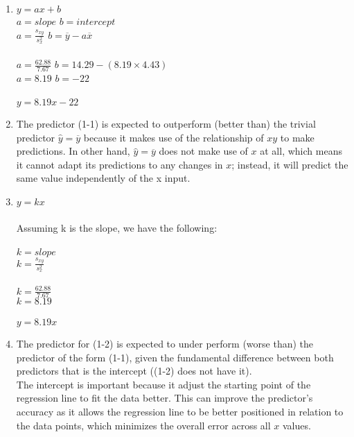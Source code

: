 \documentclass{assignment}
\begin{document}
\begin{problem}
\begin{enumerate}[label=\alph*)]
    
    \item 
    $y = ax + b$\\
    $a = slope$  \quad  $b = intercept$ \\
    $a = \frac{s_{xy}}{s^2_x} $ \quad\quad $ b = \overline{y}-a\overline{x}$ \\\\
    $a = \frac{62.88}{7.67}$ \quad\quad $b = 14.29 - (8.19 \times 4.43)$\\
    $a = 8.19$ \quad\quad $b = -22$\\\\
    $y = 8.19x - 22$

    
    \item 
    The predictor (1-1) is expected to outperform (better than) the trivial predictor $\hat{y} = \overline{y}$ because it makes use of the relationship of $xy$ to  make predictions. In other hand, $\hat{y} = \overline{y}$ does not make use of $x$ at all, which means it cannot adapt its predictions to any changes in $x$; instead, it will predict the same value independently of the x input.

    
    \item 
    $y = kx$\\\\
    Assuming k is the slope, we have the following:\\\\
    $k = slope$\\
    $k = \frac{s_{xy}}{s^2_x} $\\\\
    $k = \frac{62.88}{7.67}$ \\
    $k = 8.19$\\\\
    $y = 8.19x$

    \item
    The predictor for (1-2) is expected to under perform (worse than) the predictor of the form (1-1), given the fundamental difference between both predictors that is the intercept ((1-2) does not have it).\\

    The intercept is important because it adjust the starting point of the regression line to fit the data better. This can improve the predictor's accuracy as it allows the regression line to be better positioned in relation to the data points, which minimizes the overall error across all $x$ values.\\


\end{enumerate}
\end{problem}
\end{document}
